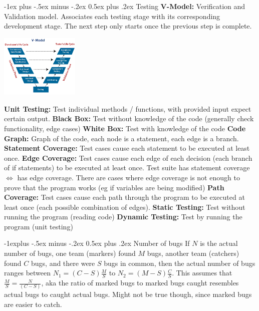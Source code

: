 \documentclass[letterpaper, 8pt]{extarticle}
\makeatletter
\renewcommand{\section}{\@startsection{section}{1}{0mm}%
                                {-1ex plus -.5ex minus -.2ex}%
                                {0.5ex plus .2ex}%
                                {\normalfont\normalsize\bfseries}}
\renewcommand{\subsection}{\@startsection{subsection}{2}{0mm}%
                                {-1explus -.5ex minus -.2ex}%
                                {0.5ex plus .2ex}%
                                {\normalfont\small\bfseries}}
\makeatother
\begin{document}
\begin{multicols*}{6}
  \section{Testing}
  \textbf{V-Model:} Verification and Validation model. Associates each testing stage with its corresponding development stage. The next
  step only starts once the previous step is complete.
  \begin{center}
    \includegraphics[height=3cm]{V-Model.png}
  \end{center}
  \textbf{Unit Testing:} Test individual methods / functions, with provided input expect certain output.
  \textbf{Black Box:} Test without knowledge of the code (generally check functionality, edge cases)
  \textbf{White Box:} Test with knowledge of the code
  \textbf{Code Graph:} Graph of the code, each node is a statement, each edge is a branch.
  \textbf{Statement Coverage:} Test cases cause each statement to be executed at least once.
  \textbf{Edge Coverage:} Test cases cause each edge of each decision (each branch of if statements) to be executed at least once.
  Test suite has statement coverage $\Leftrightarrow$ has edge coverage.
  There are cases where edge coverage is not enough to prove that the program works
  (eg if variables are being modified)
  \textbf{Path Coverage:} Test cases cause each path through the program to be executed at least once (each possible combination of edges).
  \textbf{Static Testing:} Test without running the program (reading code)
  \textbf{Dynamic Testing:} Test by running the program (unit testing)

  \subsection{Number of bugs}
  If $N$ is the actual number of bugs, one team (markers) found $M$ bugs, another team (catchers) found $C$ bugs, and there were $S$ bugs in common,
  then the actual number of bugs ranges between $N_1 = (C - S) \frac{M}{S}$ to $N_2 = (M - S) \frac{C}{S}$.
  This assumes that $\frac{M}{S} = \frac{N}{(C-S)}$, aka the ratio of marked bugs to marked bugs caught resembles actual bugs to caught actual bugs. Might not be true though, since marked bugs are easier to catch.

\end{multicols*}
\end{document}

